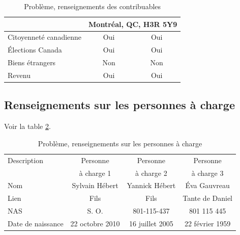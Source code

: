 \begin{table}
\begin{tabular}{|l|c|c|}
		                                         &  \multicolumn{2}{c|}{Montréal, QC, H3R 5Y9}   \\ \hline
		Citoyenneté canadienne                   &      Oui       &             Oui              \\ \hline
		Élections Canada                         &      Oui       &             Oui              \\ \hline
		Biens étrangers                          &      Non       &             Non              \\ \hline
		Revenu                                   &      Oui       &             Oui              \\ \hline
	\end{tabular}
	\caption{Problème, renseignements des contribuables}
	\label{table:chapitre4ProblemeRenseignementsContribuables}
\end{table}


\subsection{Renseignements sur les personnes à charge}
Voir la table \ref{table:chapitre4ProblemeRenseignementsPersonnesACharge}.
\begin{table}
	\centering
	\begin{tabular}{|l|c|c|c|}
		\hline
		\rowcolor{LightGreen} Description &    Personne     &    Personne     &    Personne     \\
		\rowcolor{LightGreen}             &   à charge 1    &   à charge 2    &   à charge 3    \\ \hline
		Nom                               & Sylvain Hébert  & Yannick Hébert  &  Éva Gauvreau   \\ \hline
		Lien                              &      Fils       &      Fils       & Tante de Daniel \\ \hline
		NAS                               &      S. O.      &   801-115-437   &   801 115 445   \\ \hline
		Date de naissance                 & 22 octobre 2010 & 16 juillet 2005 & 22 février 1959 \\ \hline
	\end{tabular}
	\caption{Problème, renseignements sur les personnes à charge}
	\label{table:chapitre4ProblemeRenseignementsPersonnesACharge}
\end{table}


